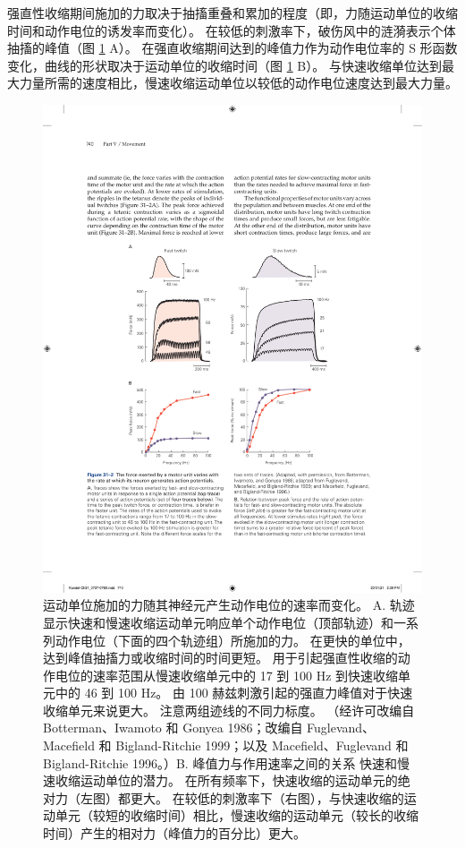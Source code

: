 强直性收缩期间施加的力取决于抽搐重叠和累加的程度（即，力随运动单位的收缩时间和动作电位的诱发率而变化）。 
在较低的刺激率下，破伤风中的涟漪表示个体抽搐的峰值（图 \ref{fig:31_2} A）。 
在强直收缩期间达到的峰值力作为动作电位率的 S 形函数变化，曲线的形状取决于运动单位的收缩时间（图 \ref{fig:31_2} B）。
与快速收缩单位达到最大力量所需的速度相比，慢速收缩运动单位以较低的动作电位速度达到最大力量。


\begin{figure}[htbp]
	\centering
	\includegraphics[width=0.7\linewidth]{chap31/fig_31_2}
	\caption{运动单位施加的力随其神经元产生动作电位的速率而变化。 A. 轨迹显示快速和慢速收缩运动单元响应单个动作电位（顶部轨迹）和一系列动作电位（下面的四个轨迹组）所施加的力。 在更快的单位中，达到峰值抽搐力或收缩时间的时间更短。 用于引起强直性收缩的动作电位的速率范围从慢速收缩单元中的 17 到 100 Hz 到快速收缩单元中的 46 到 100 Hz。 由 100 赫兹刺激引起的强直力峰值对于快速收缩单元来说更大。 注意两组迹线的不同力标度。 （经许可改编自 Botterman、Iwamoto 和 Gonyea 1986；改编自 Fuglevand、Macefield 和 Bigland-Ritchie 1999；以及 Macefield、Fuglevand 和 Bigland-Ritchie 1996。）B. 峰值力与作用速率之间的关系 快速和慢速收缩运动单位的潜力。 在所有频率下，快速收缩的运动单元的绝对力（左图）都更大。 在较低的刺激率下（右图），与快速收缩的运动单元（较短的收缩时间）相比，慢速收缩的运动单元（较长的收缩时间）产生的相对力（峰值力的百分比）更大。}
	\label{fig:31_2}
\end{figure}


